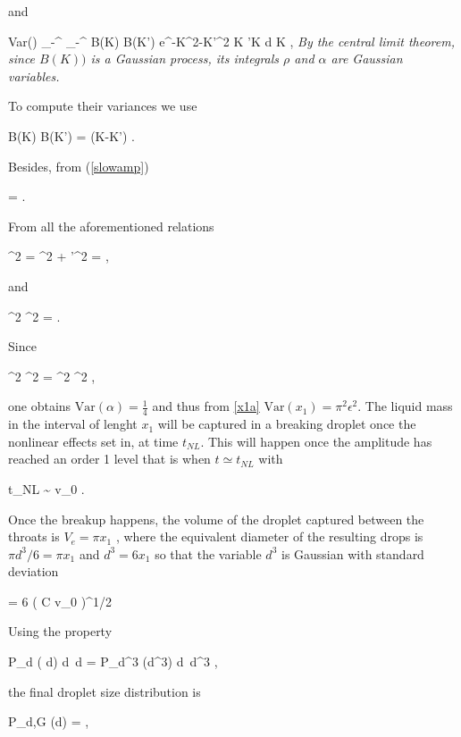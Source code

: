 and

\be
Var(\rho \alpha) \simeq  \int_{-\infty}^{\infty} \int_{-\infty}^{\infty}  B(K) B(K') e^{-K^2-K'^2}  K 'K {\textrm{d}} K , 
\nd
{\em By the central limit theorem, since $B(K))$ is a Gaussian process, its integrals $\rho$ and $\alpha$ are Gaussian variables.}

To compute their variances we use

\be
\langle B(K) \overline B(K') \rangle =  \delta(K-K') .
\nd

Besides, from (\ref{slowamp}) 

\be
\langle \rho \rangle =  . 
\nd

From all the aforementioned relations  

\be
\langle \rho^2 \rangle = \langle \rho \rangle^2 + \langle \rho'^2 \rangle =   , 
\nd

and

\be
\langle \rho^2 \alpha^2 \rangle =   . 
\nd

Since

\be
\langle \rho^2 \alpha^2 \rangle =  \langle \rho^2 \rangle \langle \alpha^2 \rangle , 
\nd

one obtains $\textrm{Var}( \alpha ) = \frac 14$
and thus from \eqref{x1a}  $\textrm{Var}(x_1) =\pi^2 \epsilon^2$.
The liquid mass in the interval of lenght $x_1$ will be captured in a breaking droplet
once the nonlinear effects set in, at time $t_{NL}$. This will happen once the
amplitude has reached an order 1 level that is when $t \simeq t_{NL}$ with

\be
t_{NL} \sim {} \ln v_0 .
\nd

Once the breakup happens, the volume of the droplet captured between the throats is
$  V_e = \pi  x_1$ , where the equivalent diameter of the resulting drops is
$\pi d^3/6 =  \pi  x_1$  and $d^3 = 6  x_1$ so that
the variable $d^3$ is Gaussian with standard deviation

\be
\sigma = 6  \pi \left(  {C \ln v_0} \right)^{1/2}
\label{d6_std}
\nd

Using the property 

\be
P_d ( d) {\textrm{d}} d = P_{d^3} (d^3) {\textrm{d}} d^3 ,
\nd

the final droplet size distribution is

\be
  P_{d,G} (d) =   \exp{} , 
\label{theory_d6}
\nd

